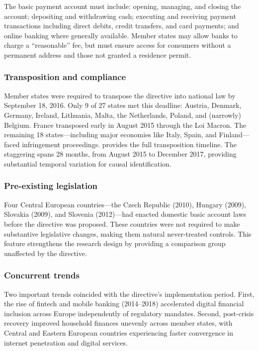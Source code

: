 \documentclass[12pt]{article}
\begin{document}
The basic payment account must include: opening, managing, and closing the account; depositing and withdrawing cash; executing and receiving payment transactions including direct debits, credit transfers, and card payments; and online banking where generally available. Member states may allow banks to charge a ``reasonable'' fee, but must ensure access for consumers without a permanent address and those not granted a residence permit.

\subsubsection*{Transposition and compliance} Member states were required to transpose the directive into national law by September 18, 2016. Only 9 of 27 states met this deadline: Austria, Denmark, Germany, Ireland, Lithuania, Malta, the Netherlands, Poland, and (narrowly) Belgium. France transposed early in August 2015 through the Loi Macron. The remaining 18 states---including major economies like Italy, Spain, and Finland---faced infringement proceedings.  provides the full transposition timeline. The staggering spans 28 months, from August 2015 to December 2017, providing substantial temporal variation for causal identification.

\subsubsection*{Pre-existing legislation} Four Central European countries---the Czech Republic (2010), Hungary (2009), Slovakia (2009), and Slovenia (2012)---had enacted domestic basic account laws before the directive was proposed. These countries were not required to make substantive legislative changes, making them natural never-treated controls. This feature strengthens the research design by providing a comparison group unaffected by the directive.

\subsubsection*{Concurrent trends} Two important trends coincided with the directive's implementation period. First, the rise of fintech and mobile banking (2014--2018) accelerated digital financial inclusion across Europe independently of regulatory mandates. Second, post-crisis recovery improved household finances unevenly across member states, with Central and Eastern European countries experiencing faster convergence in internet penetration and digital services.
\end{document}
